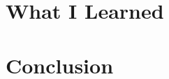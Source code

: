 \documentclass[12pt]{article}
\begin{document}
{\pagebreak

\section{What I Learned}

\pagebreak

\section{Conclusion}

}

\printbibliography
\end{document}
